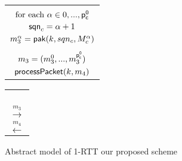 \begin{figure*}[!htp]
\begin{center}
\begin{enumerate}
{\begin{minipage}[t]{0.38\textwidth}
\begin{tabular}{c}
    $ $ \\
    $\text{for each } \alpha \in {0,...,\ensuremath{\mathsf{p_c^{0}}}}$ \\
    $\mathsf{sqn}_c = \alpha + 1$ \\
    $m_3^{\alpha} = \mathsf{pak}(k, sqn_c, M_c^{\alpha})$ \\
    $ $ \\
    $m_3 = (m_3^{0},...,m_3^{\mathsf{p_c^{0}}})$ \\
    $\mathsf{processPacket}(k, m_4)$ \\
   \end{tabular}
  \end{minipage}%
 }
 \begin{minipage}[t]{0.13\textwidth}
  \centering
  \begin{tabular}{c}
   $ $ \\
   $ $ \\
   $ $ \\
   $ $ \\
   $\xrightarrow{m_3}$ \\
   $\xleftarrow{m_4}$ \\
  \end{tabular}
 \end{minipage}%
\end{enumerate}

 \caption{Abstract model of 1-RTT our proposed scheme}\label{fig:quic_prop_1rtt}
 \end{center}
\end{figure*}